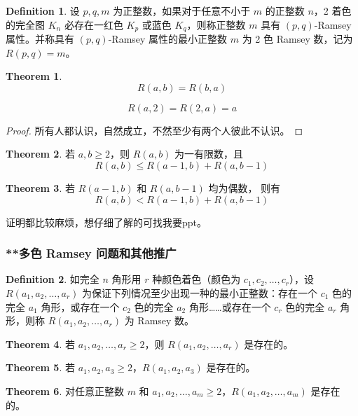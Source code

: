 \documentclass[oneside]{book}
\theoremstyle{definition}
\newtheorem{definition}{Definition}[section]
\newtheorem{theorem}{Theorem}[section]
\begin{document}
	\begin{definition}
		设 \( p, q, m \) 为正整数，如果对于任意不小于 \( m \) 的正整数 \( n \)，2 着色的完全图 \( K_n \) 必存在一红色 \( K_p \) 或蓝色 \( K_q \)，则称正整数 \( m \) 具有 \((p, q)\)-Ramsey 属性。并称具有 \((p, q)\)-Ramsey 属性的最小正整数 \( m \) 为 2 色 Ramsey 数，记为 \( R(p, q) = m \)。
	\end{definition}
	
	\begin{theorem}
		\[
		R(a,b) = R(b,a)
		\]
		
		\[
		R(a,2) = R(2,a) = a
		\]
	\end{theorem}
	\begin{proof}
	所有人都认识，自然成立，不然至少有两个人彼此不认识。	
	\end{proof}
	\begin{theorem}
		若 \( a, b \geq 2 \)，则 \( R(a, b) \) 为一有限数，且  
		\[R(a, b) \leq R(a-1, b) + R(a, b-1)\]
	\end{theorem}
	\begin{theorem}
		若 \( R(a-1,b) \) 和 \( R(a,b-1) \) 均为偶数，  
		则有  
		\[R(a,b) < R(a-1,b) + R(a,b-1)\]
	\end{theorem}
	证明都比较麻烦，想仔细了解的可找我要ppt。
	
	
	\subsubsection{**多色 Ramsey 问题和其他推广}
	\begin{definition}
		如完全 \( n \) 角形用 \( r \) 种颜色着色（颜色为 \( c_1, c_2, \ldots, c_r \)），设 \( R(a_1, a_2, \ldots, a_r) \) 为保证下列情况至少出现一种的最小正整数：存在一个 \( c_1 \) 色的完全 \( a_1 \) 角形，或存在一个 \( c_2 \) 色的完全 \( a_2 \) 角形……或存在一个 \( c_r \) 色的完全 \( a_r \) 角形，则称 \( R(a_1, a_2, \ldots, a_r) \) 为 Ramsey 数。
	\end{definition}
	\begin{theorem}
		若 \( a_1, a_2, \ldots, a_r \geq 2 \)，则 \( R(a_1, a_2, \ldots, a_r) \) 是存在的。
	\end{theorem}
	
	\begin{theorem}
		若 \( a_1, a_2, a_3 \geq 2 \)，\( R(a_1, a_2, a_3) \) 是存在的。
	\end{theorem}
	
	\begin{theorem}
		对任意正整数 \( m \) 和 \( a_1, a_2, \ldots, a_m \geq 2 \)，\( R(a_1, a_2, \ldots, a_m) \) 是存在的。
	\end{theorem}
	
\end{document}
